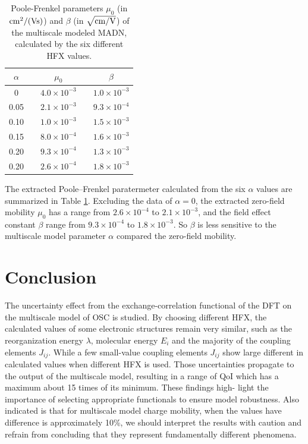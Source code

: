 \documentclass[%
 reprint,
superscriptaddress,
 amsmath,amssymb,
 aps,
prb,
floatfix
]{revtex4-2}
\begin{document}
%
\begin{table}[tbp]%
  \caption{\label{tab:PF_parameter}%
  Poole-Frenkel parameters $\mu_0$ (in $\unit[]{cm^2/(Vs)}$) and $\beta$ (in $\unit[]{\sqrt{cm/V}}$) of the multiscale modeled MADN, calculated by the six different HFX values. 
  }
  \begin{ruledtabular}
    \begin{tabular}{c c c c c}
    $\alpha$ & & $\mu_0$  & & $\beta$ \\
      \hline
    0 & & $4.0 \times 10^{-3}$ & & $1.0 \times 10^{-3}$ \\
    0.05 & & $2.1 \times 10^{-3}$ & & $9.3 \times 10^{-4}$ \\
    0.10 & & $1.0 \times 10^{-3}$ & & $1.5 \times 10^{-3}$ \\
    0.15 & & $8.0 \times 10^{-4}$ & & $1.6 \times 10^{-3}$ \\
    0.20 & & $9.3 \times 10^{-4}$ & & $1.3 \times 10^{-3}$ \\
    0.20 & & $2.6 \times 10^{-4}$ & & $1.8 \times 10^{-3}$ \\
      \end{tabular}
  \end{ruledtabular}
  \end{table}
%  
The extracted Poole–Frenkel paratermeter calculated from the six $\alpha$ values are summarized in Table \ref{tab:PF_parameter}. 
Excluding the data of $\alpha=0$, the extracted zero-field mobility $\mu_0$ has a range from $2.6 \times 10^{-4}$ to $2.1 \times 10^{-3}$, and the field effect constant $\beta$ range from $9.3 \times 10^{-4}$ to $1.8 \times 10^{-3}$.
So $\beta$ is less sensitive to the multiscale model parameter $\alpha$ compared the zero-field mobility.
\section{Conclusion}
The uncertainty effect from the exchange-correlation functional of the DFT on the multiscale model of OSC is studied. By choosing different HFX, the calculated values of some electronic structures remain very similar,
such as the reorganization energy $\lambda$, molecular energy $E_i$ and the majority of the coupling elements  $J_{ij}$. While a few small-value coupling elements $J_{ij}$ show large different in calculated values when different HFX is used. Those uncertainties propagate to the output of the multiscale model, resulting in a range of QoI which has a maximum about 15 times of its minimum. These findings high-
light the importance of selecting appropriate functionals to ensure model robustness. Also indicated is that for multiscale model charge mobility, when the values have difference is approximately 10\%, we should interpret the results with caution and refrain from concluding that they represent fundamentally different phenomena.
\end{document}
